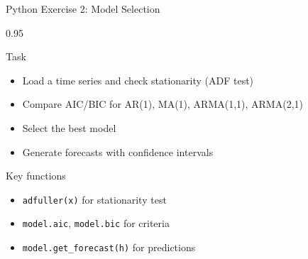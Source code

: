 \documentclass[9pt, aspectratio=169, t]{beamer}
\begin{document}
\begin{frame}{Python Exercise 2: Model Selection}
    \begin{cminipage}{0.95\textwidth}
    \begin{alertblock}{Task}
        \begin{itemize}\setlength{\itemsep}{0pt}
            \item Load a time series and check stationarity (ADF test)
            \item Compare AIC/BIC for AR(1), MA(1), ARMA(1,1), ARMA(2,1)
            \item Select the best model
            \item Generate forecasts with confidence intervals
        \end{itemize}
    \end{alertblock}

    \vspace{0.2cm}
    \begin{exampleblock}{Key functions}
        \begin{itemize}\setlength{\itemsep}{0pt}
            \item \texttt{adfuller(x)} for stationarity test
            \item \texttt{model.aic}, \texttt{model.bic} for criteria
            \item \texttt{model.get\_forecast(h)} for predictions
        \end{itemize}
    \end{exampleblock}
    \end{cminipage}
\end{frame}
\end{document}
